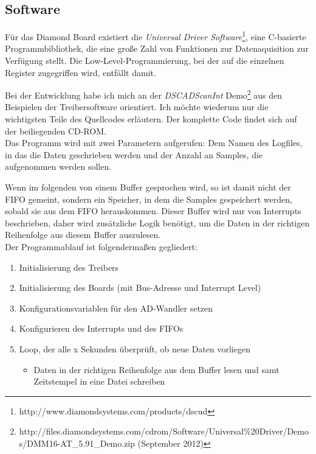 \documentclass[12pt,a4paper,twoside,BCOR=12.5mm]{scrartcl}
\begin{document}
\subsection{Software}

Für das Diamond Board existiert die \textit{Universal Driver Software}\footnote{http://www.diamondsystems.com/products/dscud}, eine C-basierte Programmbibliothek, die eine große Zahl von Funktionen zur Datenaquisition zur Verfügung stellt. Die Low-Level-Programmierung, bei der auf die einzelnen Register zugegriffen wird, entfällt damit. 

Bei der Entwicklung habe ich mich an der \textit{DSCADScanInt} Demo\footnote{http://files.diamondsystems.com/cdrom/Software/Universal\%20Driver/Demos/DMM16-AT\_5.91\_Demo.zip (September 2012)} aus den Beispielen der Treibersoftware orientiert.
Ich möchte wiederum nur die wichtigsten Teile des Quellcodes erläutern. Der komplette Code findet sich auf der beiliegenden CD-ROM. \\

Das Programm wird mit zwei Parametern aufgerufen: Dem Namen des Logfiles, in das die Daten geschrieben werden und der Anzahl an Samples, die aufgenommen werden sollen. 

Wenn im folgenden von einem Buffer gesprochen wird, so ist damit nicht der FIFO gemeint, sondern ein Speicher, in dem die Samples gespeichert werden, sobald sie aus dem FIFO herauskommen. Dieser Buffer wird nur von Interrupts beschrieben, daher wird zusätzliche Logik benötigt, um die Daten in der richtigen Reihenfolge aus diesem Buffer auszulesen. \\

Der Programmablauf ist folgendermaßen gegliedert:

\begin{enumerate}
	\item Initialisierung des Treibers
	\item Initialisierung des Boards (mit Bus-Adresse und Interrupt Level)
	\item Konfigurationsvariablen für den AD-Wandler setzen
	\item Konfigurieren des Interrupts und des FIFOs
	\item Loop, der alle x Sekunden überprüft, ob neue Daten vorliegen
		\begin{itemize}
			\item Daten in der richtigen Reihenfolge aus dem Buffer lesen und samt Zeitstempel in eine Datei schreiben
		\end{itemize}
\end{enumerate}
\end{document}
